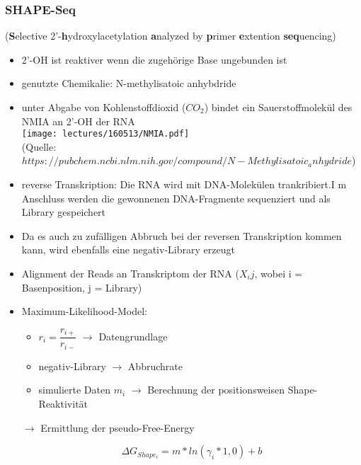 \subsubsection{SHAPE-Seq}
(\textbf{S}elective 2'-\textbf{h}ydroxylacetylation \textbf{a}nalyzed by \textbf{p}rimer \textbf{e}xtention \textbf{seq}uencing)

\begin{itemize}
\item 2'-OH ist reaktiver wenn die zugehörige Base ungebunden ist
\item genutzte Chemikalie: N-methylisatoic anhybdride
\item unter Abgabe von Kohlenstoffdioxid ($CO_2$) bindet ein Sauerstoffmolekül des NMIA an 2'-OH der RNA \\
\texttt{[image: lectures/160513/NMIA.pdf]} \\
(Quelle: $https://pubchem.ncbi.nlm.nih.gov/compound/N-Methylisatoic_anhydride$) \\

\item reverse Transkription: Die RNA wird mit DNA-Molekülen trankribiert.I m Anschluss werden die gewonnenen DNA-Fragmente sequenziert und als Library gespeichert
\item Da es auch zu zufälligen Abbruch bei der reversen Transkription kommen kann, wird ebenfalls eine negativ-Library erzeugt
\item Alignment der Reads an Transkriptom der RNA ($X_ij$, wobei i = Basenposition, j = Library)

\item Maximum-Likelihood-Model:

\begin{itemize}
\item $r_i = \dfrac{r_{i+}}{r_{i-}}$ $\rightarrow$ Datengrundlage
\item negativ-Library $\rightarrow$ Abbruchrate
\item simulierte Daten $m_i$ $\rightarrow$ Berechnung der positionsweisen Shape-Reaktivität 
\end{itemize}

\item[$\rightarrow$] Ermittlung der pseudo-Free-Energy

\begin{equation}
\Delta G_{Shape_i} = m * ln(\gamma_i * 1,0) + b
\end{equation}

\end{itemize}

